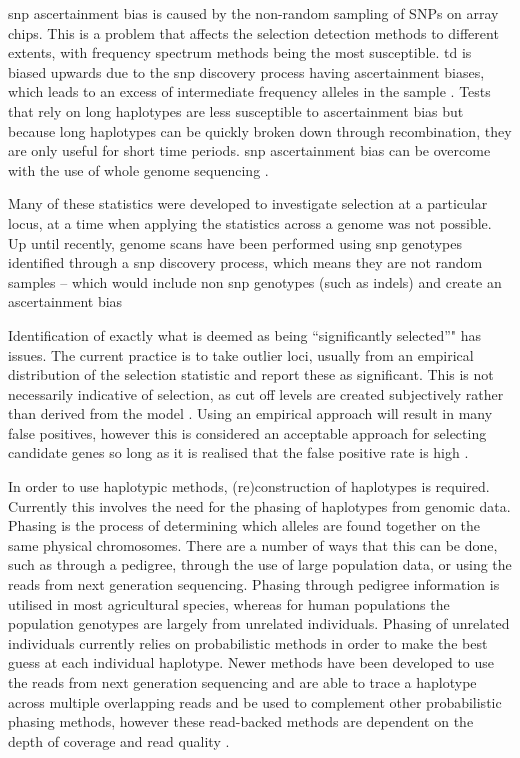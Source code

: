 \documentclass[twoside,openright]{report}
\begin{document}
\Gls{snp} ascertainment bias is caused by the non-random sampling of
SNPs on array chips. This is a problem that affects the selection
detection methods to different extents, with frequency spectrum methods
being the most susceptible. \Gls{td} is biased upwards due to the
\gls{snp} discovery process having ascertainment biases, which leads to
an excess of intermediate frequency alleles in the sample
\citep{Kelley2006}. Tests that rely on long haplotypes are less
susceptible to ascertainment bias \citep{sabeti2006positive} but because
long haplotypes can be quickly broken down through recombination, they
are only useful for short time periods. \Gls{snp} ascertainment bias can
be overcome with the use of whole genome sequencing
\citep{Albrechtsen2010}.

Many of these statistics were developed to investigate selection at a
particular locus, at a time when applying the statistics across a genome
was not possible. Up until recently, genome scans have been performed
using \gls{snp} genotypes identified through a \gls{snp} discovery
process, which means they are not random samples -- which would include
non \gls{snp} genotypes (such as \glspl{indel}) and create an
ascertainment bias \citep{Nielsen2005a}

Identification of exactly what is deemed as being ``significantly
selected''" has issues. The current practice is to take outlier loci,
usually from an empirical distribution of the selection statistic and
report these as significant. This is not necessarily indicative of
selection, as cut off levels are created subjectively rather than
derived from the model \citep{Qanbari2012a}. Using an empirical approach
will result in many false positives, however this is considered an
acceptable approach for selecting candidate genes so long as it is
realised that the false positive rate is high \citep{Kelley2006}.

In order to use haplotypic methods, (re)construction of haplotypes is
required. Currently this involves the need for the phasing of haplotypes
from genomic data. Phasing is the process of determining which alleles
are found together on the same physical chromosomes. There are a number
of ways that this can be done, such as through a pedigree, through the
use of large population data, or using the reads from next generation
sequencing. Phasing through pedigree information is utilised in most
agricultural species, whereas for human populations the population
genotypes are largely from unrelated individuals. Phasing of unrelated
individuals currently relies on probabilistic methods
\citep{Browning2009, Delaneau2012, Delaneau2013} in order to make the
best guess at each individual haplotype. Newer methods have been
developed to use the reads from next generation sequencing and are able
to trace a haplotype across multiple overlapping reads and be used to
complement other probabilistic phasing methods, however these
read-backed methods are dependent on the depth of coverage and read
quality \citep{Delaneau2014}.
\end{document}
